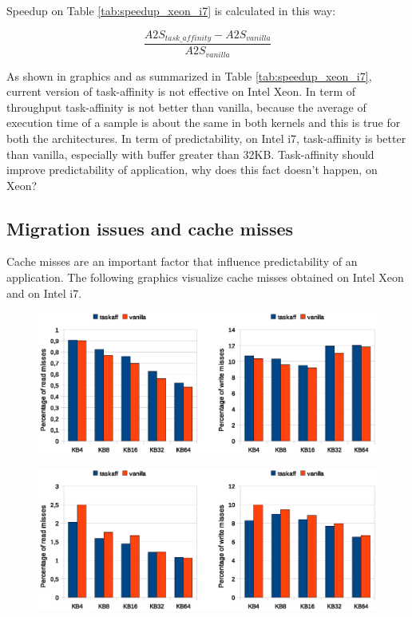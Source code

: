 Speedup on Table \ref{tab:speedup_xeon_i7} is calculated in this way:

\begin{equation}
        \frac{A2S_{task\_affinity} - A2S_{vanilla}}{A2S_{vanilla}}
\label{eq:miss_rate}
\end{equation}

As shown in graphics and as summarized in Table \ref{tab:speedup_xeon_i7}, current version of task-affinity is not effective on Intel Xeon.
In term of throughput task-affinity is not better than vanilla, because the average of execution time of a sample is about the same in both kernels and this
is true for both the architectures. In term of predictability, on Intel i7, task-affinity is better than vanilla, especially with buffer greater than 32KB.
Task-affinity should improve predictability of application, why does this fact doesn't happen, on Xeon?

\subsection{Migration issues and cache misses}

Cache misses are an important factor that influence predictability of an application. The following graphics visualize cache misses obtained on Intel 
Xeon and on Intel i7.

\begin{figure}[htbp]
 \centering
  \includegraphics[width=\widefigure]{images/cache_miss/l1_load_store_Xeon.eps}
  \label{fig:l1_load_store_Xeon}
 \caption{}
\end{figure}

\begin{figure}[htbp]
 \centering
  \includegraphics[width=\widefigure]{images/cache_miss/l1_load_store_i7.eps}
  \label{fig:l1_load_store_Xeon}
 \caption{}
\end{figure}

